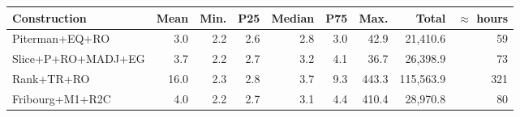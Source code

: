 \begin{tabular}{LrrrrrrRr}
  \hline
Construction & Mean & Min. & P25 & Median & P75 & Max. & Total & $\approx$ hours \\ 
  \hline
Piterman+EQ+RO & 3.0 & 2.2 & 2.6 & 2.8 & 3.0 & 42.9 & 21,410.6 & 59 \\ 
  Slice+P+RO+MADJ+EG & 3.7 & 2.2 & 2.7 & 3.2 & 4.1 & 36.7 & 26,398.9 & 73 \\ 
  Rank+TR+RO & 16.0 & 2.3 & 2.8 & 3.7 & 9.3 & 443.3 & 115,563.9 & 321 \\ 
  Fribourg+M1+R2C & 4.0 & 2.2 & 2.7 & 3.1 & 4.4 & 410.4 & 28,970.8 & 80 \\ 
   \hline
\end{tabular}
